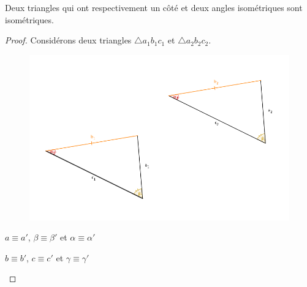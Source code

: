 \documentclass[a4paper,12pt]{article}
\begin{document}
\pagebreak
\begin{corollary}
Deux triangles qui ont respectivement un côté et deux angles isométriques sont isométriques.
\end{corollary}

\begin{proof}
Considérons deux triangles $\triangle a_1b_1c_1$ et $\triangle a_2b_2c_2$.

\begin{figure}[H]
    \centering
    \includegraphics[scale=0.5]{theorems/corIsom2/corIsom2.png}
\end{figure}

\begin{hyp}
$a \equiv a'$, $\beta \equiv \beta'$ et $\alpha \equiv \alpha'$
\end{hyp}
\begin{concl}
$b \equiv b'$, $c \equiv c'$ et  $\gamma \equiv \gamma'$
\end{concl}


\end{proof}
\end{document}
